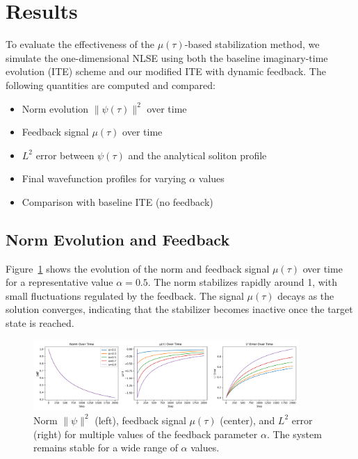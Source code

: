 \documentclass[12pt]{article}
\begin{document}
\section{Results}

To evaluate the effectiveness of the $\mu(\tau)$-based stabilization method, we simulate the one-dimensional NLSE using both the baseline imaginary-time evolution (ITE) scheme and our modified ITE with dynamic feedback. The following quantities are computed and compared:

\begin{itemize}
    \item Norm evolution $\|\psi(\tau)\|^2$ over time
    \item Feedback signal $\mu(\tau)$ over time
    \item $L^2$ error between $\psi(\tau)$ and the analytical soliton profile
    \item Final wavefunction profiles for varying $\alpha$ values
    \item Comparison with baseline ITE (no feedback)
\end{itemize}

\subsection*{Norm Evolution and Feedback}

Figure~\ref{fig:norm-mu} shows the evolution of the norm and feedback signal $\mu(\tau)$ over time for a representative value $\alpha = 0.5$. The norm stabilizes rapidly around 1, with small fluctuations regulated by the feedback. The signal $\mu(\tau)$ decays as the solution converges, indicating that the stabilizer becomes inactive once the target state is reached.

\begin{figure}[h]
    \centering
    \includegraphics[width=0.9\textwidth]{figures/diagnostics_alpha_sweep.png}
    \caption{Norm $\|\psi\|^2$ (left), feedback signal $\mu(\tau)$ (center), and $L^2$ error (right) for multiple values of the feedback parameter $\alpha$. The system remains stable for a wide range of $\alpha$ values.}
    \label{fig:norm-mu}
\end{figure}
\end{document}

